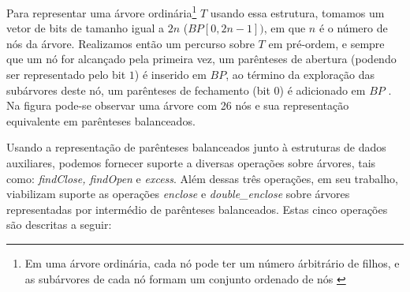Para representar uma árvore ordinária\footnote{Em uma árvore ordinária, cada nó pode ter um número árbitrário de filhos, e as subárvores de cada nó formam um conjunto ordenado de nós \citep{tenenbaum}} $T$ usando essa estrutura, tomamos um vetor de bits de tamanho igual a $2n$ ($BP[0,2n-1])$, em que $n$ é o número de nós da árvore. Realizamos então um percurso sobre $T$ em pré-ordem, e sempre que um nó for alcançado pela primeira vez, um parênteses de abertura (podendo ser representado pelo bit $1$) é inserido em $BP$, ao término da exploração das subárvores deste nó, um parênteses de fechamento (bit $0$) é adicionado em $BP$ \citep{paper-succint-trees-in-practice}.  Na figura  pode-se observar uma árvore com 26 nós e sua representação equivalente em parênteses balanceados.

Usando a representação de parênteses balanceados junto à  estruturas de dados auxiliares, podemos fornecer suporte a diversas operações sobre árvores, tais como: \textit{findClose, findOpen} e \textit{excess}. Além dessas três operações, \citet{paper-succint-representation-of-balanced-parentheses} em seu trabalho, viabilizam suporte as operações  \textit{enclose} e \textit{double\_enclose} sobre árvores representadas por intermédio de parênteses balanceados. Estas cinco operações são descritas a seguir:

